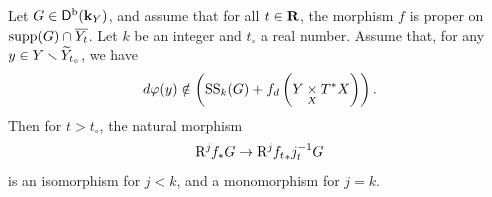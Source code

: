 \begin{Theorem+}\label{prop:rel-t-morse}
  Let \(G\in\Dompb(\kk_Y)\), and assume that 
  for all \(t\in\rr\), the morphism 
  \(f\) is proper on \(\supp(G)\cap \overline{Y_t}\). 
  Let \(k\) be an integer and \(t_\circ\) a real number.
    Assume that, 
    for any \(y\in Y\smi \widetilde{Y}_{t_{\circ}}\), 
    we have \begin{equation}\label{eq:hyp-morse}
      d\varphi(y)\notin \left(
        \muS[k](G)+ \mdiff[f]\left(
          Y\pb[X]\cotb[X]
        \right)
      \right).
    \end{equation}
    Then 
    for \(t>t_\circ\), the natural morphism
        \[
          \Rder[j]{f_{\ast}}G \to \Rder[j]{{f_{t}}_{\ast}}j^{-1}_{t}G
        \]
        is an isomorphism for \(j<k\), 
        and a monomorphism for \(j=k\).    

\end{Theorem+}

